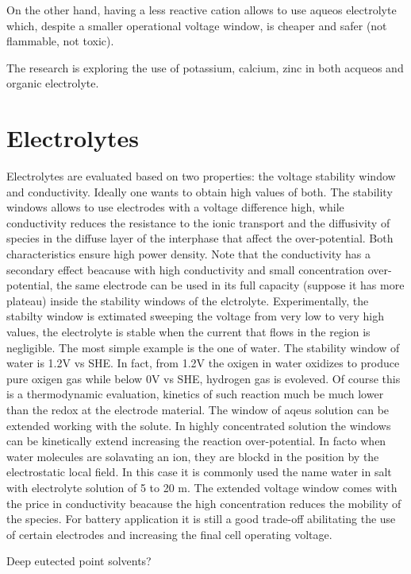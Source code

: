 On the other hand, having a less reactive cation allows to use aqueos electrolyte which, despite a smaller operational voltage window, is cheaper and safer (not flammable, not toxic).

The research is exploring the use of potassium, calcium, zinc in both acqueos and organic electrolyte.

\section{Electrolytes}

Electrolytes are evaluated based on two properties: the voltage stability window and conductivity. Ideally one wants to obtain high values of both. The stability windows allows to use electrodes with a voltage difference high, while conductivity reduces the resistance to the ionic transport and the diffusivity of species in the diffuse layer of the interphase that affect the over-potential. Both characteristics ensure high power density. Note that the conductivity has a secondary effect beacause with high conductivity and small concentration over-potential, the same electrode can be used in its full capacity (suppose it has more plateau) inside the stability windows of the elctrolyte. Experimentally, the stabilty window is extimated sweeping the voltage from very low to very high values, the electrolyte is stable when the current that flows in the region is negligible. The most simple example is the one of water. The stability window of water is 1.2V vs SHE. In fact, from 1.2V the oxigen in water oxidizes to produce pure oxigen gas while below 0V vs SHE, hydrogen gas is evoleved. Of course this is a thermodynamic evaluation, kinetics of such reaction much be much lower than the redox at the electrode material. The window of aqeus solution can be extended working with the solute. In highly concentrated solution the windows can be kinetically extend increasing the reaction over-potential. In facto when water molecules are solavating an ion, they are blockd in the position by the electrostatic local field. In this case it is commonly used the name water in salt with electrolyte solution of 5 to 20 m. The extended voltage window comes with the price in conductivity beacause the high concentration reduces the mobility of the species. For battery application it is still a good trade-off abilitating the use of certain electrodes and increasing the final cell operating voltage.

Deep eutected point solvents?

